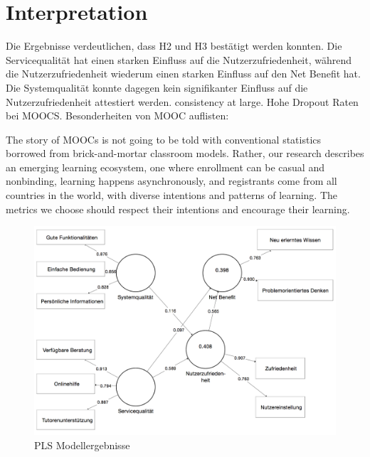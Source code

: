 \section{Interpretation}
\label{sec:vergleich}
Die Ergebnisse verdeutlichen, dass H2 und H3 bestätigt werden konnten. Die Servicequalität hat einen starken Einfluss auf die Nutzerzufriedenheit, während die Nutzerzufriedenheit wiederum einen starken Einfluss auf den Net Benefit hat. Die Systemqualität konnte dagegen kein signifikanter Einfluss auf die Nutzerzufriedenheit attestiert werden.  
\todo consistency at large. 
Hohe Dropout Raten bei MOOCS. Besonderheiten von MOOC auflisten: 


The story of MOOCs is not going to be told with conventional statistics borrowed from brick-and-mortar classroom models. Rather, our research describes an emerging learning ecosystem, one where enrollment can be casual and nonbinding, learning happens asynchronously, and registrants come from all countries in the world, with diverse intentions and patterns of learning. The metrics we choose should respect their intentions and encourage their learning.\parencite{reich2014tricky}


\begin{figure}[h]
\centering
\includegraphics[width=1\textwidth]{Grafiken/pls_bw_3.png}
\caption{PLS Modellergebnisse}
\label{PLS Modellergebnisse}
\end{figure}